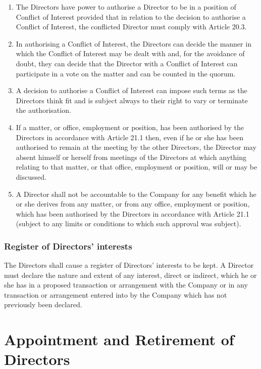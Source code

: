 \documentclass[a4paper,12pt]{article}
\begin{document}
\begin{enumerate}
  \item The Directors have power to authorise a Director to be in a position of Conflict of Interest provided that in relation to the decision to authorise a Conflict of Interest, the conflicted Director must comply with Article 20.3. %
  \item In authorising a Conflict of Interest, the Directors can decide the manner in which the Conflict of Interest may be dealt with and, for the avoidance of doubt, they can decide that the Director with a Conflict of Interest can participate in a vote on the matter and can be counted in the quorum. %
  \item A decision to authorise a Conflict of Interest can impose such terms as the Directors think fit and is subject always to their right to vary or terminate the authorisation. %
  \item If a matter, or office, employment or position, has been authorised by the Directors in accordance with Article 21.1 then, even if he or she has been authorised to remain at the meeting by the other Directors, the Director may absent himself or herself from meetings of the Directors at which anything relating to that matter, or that office, employment or position, will or may be discussed.
  \item	A Director shall not be accountable to the Company for any benefit which he or she derives from any matter, or from any office, employment or position, which has been authorised by the Directors in accordance with Article 21.1 (subject to any limits or conditions to which such approval was subject).
\end{enumerate}

\section{Register of Directors’ interests}

The Directors shall cause a register of Directors’ interests to be kept. A Director must declare the nature and extent of any interest, direct or indirect, which he or she has in a proposed transaction or arrangement with the Company or in any transaction or arrangement entered into by the Company which has not previously been declared.

\part{Appointment and Retirement of Directors}
\end{document}
